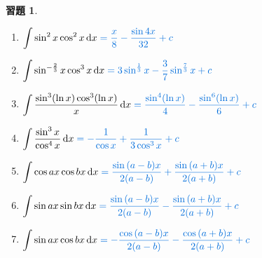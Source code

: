 \documentclass[12pt]{extarticle}
\newcommand{\ds}{\displaystyle}
\theoremstyle{definition}
\newtheorem*{exe}{習題}
\begin{document}
\begin{exe}
\begin{multicols}{2}
\begin{enumerate}
      \item $\ds\int\sin^2 x\cos^2 x\,\mathrm{d}x {\color{C2}\;= \frac{x}{8} - \frac{\sin 4x}{32} + c}$
      \item $\ds\int\sin^{-\frac{2}{3}} x\cos^3 x\,\mathrm{d}x {\color{C2}\;= 3\sin^{\frac{1}{3}}x - \frac{3}{7}\sin^{\frac{7}{3}}x + c}$
      \item $\ds\int\frac{\sin^3(\ln x)\cos^3(\ln x)}{x}\,\mathrm{d}x {\color{C2}\;= \frac{\sin^4(\ln x)}{4} - \frac{\sin^6(\ln x)}{6} + c}$
      \item $\ds\int\frac{\sin^3 x}{\cos^4 x}\,\mathrm{d}x {\color{C2}\;= -\frac{1}{\cos x} + \frac{1}{3\cos^3 x} + c}$
      \item $\ds\int\cos ax\cos bx\,\mathrm{d}x {\color{C2}\;= \frac{\sin{(a-b)x}}{2(a-b)} + \frac{\sin{(a+b)x}}{2(a+b)} + c}$
      \item $\ds\int\sin ax\sin bx\,\mathrm{d}x {\color{C2}\;= \frac{\sin{(a-b)x}}{2(a-b)} - \frac{\sin{(a+b)x}}{2(a+b)} + c}$
      \item $\ds\int\sin ax\cos bx\,\mathrm{d}x {\color{C2}\;= -\frac{\cos{(a-b)x}}{2(a-b)} - \frac{\cos{(a+b)x}}{2(a+b)} + c}$
    \end{enumerate} 
  \end{multicols}
\end{exe}
\end{document}
